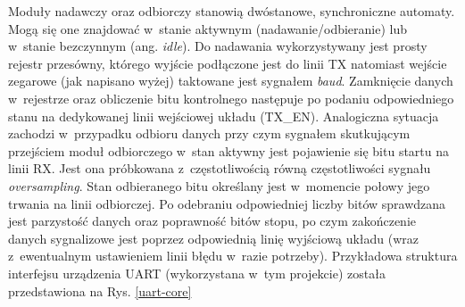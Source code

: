 Moduły nadawczy oraz odbiorczy stanowią dwóstanowe, synchroniczne automaty. Mogą się one znajdować w~stanie aktywnym (nadawanie/odbieranie) lub w~stanie bezczynnym (ang. \textit{idle}). Do nadawania wykorzystywany jest prosty rejestr przesówny, którego wyjście podłączone jest do linii TX natomiast wejście zegarowe (jak napisano wyżej) taktowane jest sygnałem \textit{baud}. Zamknięcie danych w~rejestrze oraz obliczenie bitu kontrolnego następuje po podaniu odpowiedniego stanu na dedykowanej linii wejściowej układu (TX\_EN). Analogiczna sytuacja zachodzi w~przypadku odbioru danych przy czym sygnałem skutkującym przejściem moduł odbiorczego w~stan aktywny jest pojawienie się bitu startu na linii RX. Jest ona próbkowana z~częstotliwością równą częstotliwości sygnału \textit{oversampling}. Stan odbieranego bitu określany jest w~momencie połowy jego trwania na linii odbiorczej. Po odebraniu odpowiedniej liczby bitów sprawdzana jest parzystość danych oraz poprawność bitów stopu, po czym zakończenie danych sygnalizowe jest poprzez odpowiednią linię wyjściową układu (wraz z~ewentualnym ustawieniem linii błędu w~razie potrzeby). Przykładowa struktura interfejsu urządzenia UART (wykorzystana w~tym projekcie) została przedstawiona na Rys. \ref{uart-core}
